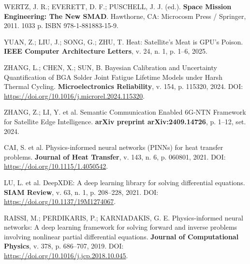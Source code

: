 \vspace{0.2cm}
\noindent WERTZ, J. R.; EVERETT, D. F.; PUSCHELL, J. J. (ed.). \textbf{Space Mission Engineering: The New SMAD}. Hawthorne, CA: Microcosm Press / Springer, 2011. 1033 p. ISBN 978-1-881883-15-9.

\vspace{0.2cm}
\noindent YUAN, Z.; LIU, J.; SONG, G.; ZHU, T. Heat: Satellite's Meat is GPU's Poison. \textbf{IEEE Computer Architecture Letters}, v. 24, n. 1, p. 1--6, 2025.

\vspace{0.2cm}
\noindent ZHANG, L.; CHEN, X.; SUN, B. Bayesian Calibration and Uncertainty Quantification of BGA Solder Joint Fatigue Lifetime Models under Harsh Thermal Cycling. \textbf{Microelectronics Reliability}, v. 154, p. 115320, 2024. DOI: \url{https://doi.org/10.1016/j.microrel.2024.115320}.

\vspace{0.2cm}
\noindent ZHANG, Z.; LI, Y. et al. Semantic Communication Enabled 6G-NTN Framework for Satellite Edge Intelligence. \textbf{arXiv preprint arXiv:2409.14726}, p. 1--12, set. 2024.

\endgroup

\noindent CAI, S. et al. Physics-informed neural networks (PINNs) for heat transfer problems. \textbf{Journal of Heat Transfer}, v. 143, n. 6, p. 060801, 2021. DOI: \url{https://doi.org/10.1115/1.4050542}.

\noindent LU, L. et al. DeepXDE: A deep learning library for solving differential equations. \textbf{SIAM Review}, v. 63, n. 1, p. 208--228, 2021. DOI: \url{https://doi.org/10.1137/19M1274067}.

\noindent RAISSI, M.; PERDIKARIS, P.; KARNIADAKIS, G. E. Physics-informed neural networks: A deep learning framework for solving forward and inverse problems involving nonlinear partial differential equations. \textbf{Journal of Computational Physics}, v. 378, p. 686--707, 2019. DOI: \url{https://doi.org/10.1016/j.jcp.2018.10.045}.